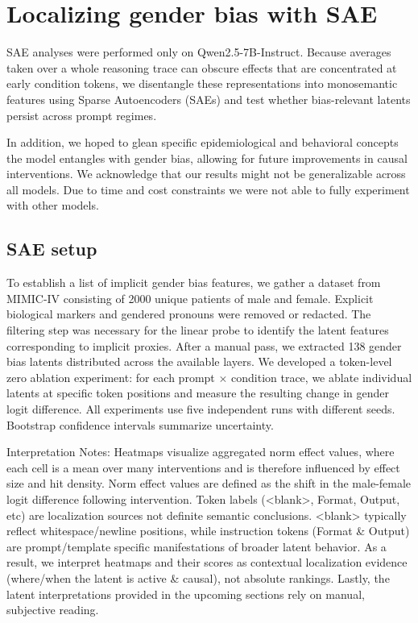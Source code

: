 \documentclass{article}
\begin{document}
\section{Localizing gender bias with SAE}
SAE analyses were performed only on Qwen2.5-7B-Instruct. Because averages taken over a whole reasoning trace can obscure effects that are concentrated at early condition tokens, we disentangle these representations into monosemantic features using Sparse Autoencoders (SAEs) and test whether bias-relevant latents persist across prompt regimes.

In addition, we hoped to glean specific epidemiological and behavioral concepts the model entangles with gender bias, allowing for future improvements in causal interventions. We acknowledge that our results might not be generalizable across all models. Due to time and cost constraints we were not able to fully experiment with other models.


\subsection{SAE setup}
To establish a list of implicit gender bias features, we gather a dataset from MIMIC-IV consisting of 2000 unique patients of male and female. Explicit biological markers and gendered pronouns were removed or redacted. The filtering step was necessary for the linear probe to identify the latent features corresponding to implicit proxies. After a manual pass, we extracted 138 gender bias latents distributed across the available layers. We developed a token-level zero ablation experiment: for each prompt $\times$ condition trace, we ablate individual latents at specific token positions and measure the resulting change in gender logit difference. All experiments use five independent runs with different seeds. Bootstrap confidence intervals summarize uncertainty.

Interpretation Notes: Heatmaps visualize aggregated norm effect values, where each cell is a mean over many interventions and is therefore influenced by effect size and hit density. Norm effect values are defined as the shift in the male-female logit difference following intervention. Token labels (<blank>, Format, Output, etc) are localization sources not definite semantic conclusions. <blank> typically reflect whitespace/newline positions, while instruction tokens (Format \& Output) are prompt/template specific manifestations of broader latent behavior. As a result, we interpret heatmaps and their scores as contextual localization evidence (where/when the latent is active \& causal), not absolute rankings. Lastly, the latent interpretations provided in the upcoming sections rely on manual, subjective reading.
\end{document}
